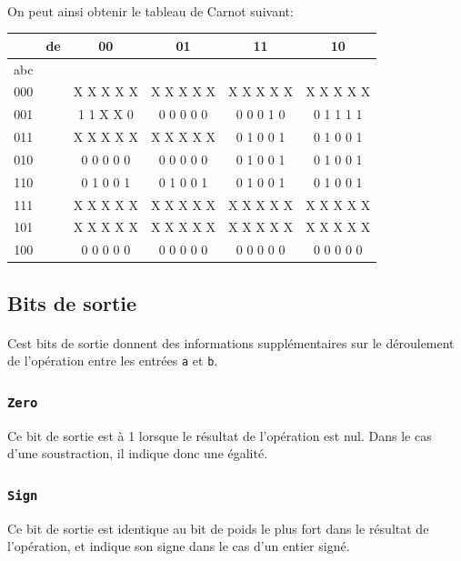 \documentclass[11pt, a4paper, twoside, titlepage]{article}
\begin{document}
\paragraph{}
On peut ainsi obtenir le tableau de Carnot suivant:
\begin{center}
	\ttfamily
	\large
	\begin{tabular}{|c|c|c|c|c|c|}
		\hline
		& de & 00 & 01 & 11 & 10 \\
		\hline
		abc &&&&& \\
		\hline 
		000 && X X X X X & X X X X X & X X X X X & X X X X X \\
		\hline 
		001 && 1 1 X X 0 & 0 0 0 0 0 & 0 0 0 1 0 & 0 1 1 1 1 \\
		\hline 
		011 && X X X X X & X X X X X & 0 1 0 0 1 & 0 1 0 0 1 \\
		\hline 
		010 && 0 0 0 0 0 & 0 0 0 0 0 & 0 1 0 0 1 & 0 1 0 0 1\\
		\hline 
		110 && 0 1 0 0 1 & 0 1 0 0 1 & 0 1 0 0 1 & 0 1 0 0 1 \\
		\hline 
		111 && X X X X X & X X X X X & X X X X X & X X X X X \\
		\hline 
		101 && X X X X X & X X X X X & X X X X X & X X X X X \\
		\hline 
		100 && 0 0 0 0 0 & 0 0 0 0 0 & 0 0 0 0 0 & 0 0 0 0 0 \\
		\hline
	\end{tabular}
\end{center}

\subsection{Bits de sortie}
\paragraph{}
Cest bits de sortie donnent des informations supplémentaires sur le déroulement de l'opération entre les entrées \texttt{a} et \texttt{b}.
	
\subsubsection{\texttt{Zero}}
Ce bit de sortie est à 1 lorsque le résultat de l'opération est nul. Dans le cas d'une soustraction, il indique donc une égalité.

\subsubsection{\texttt{Sign}}
Ce bit de sortie est identique au bit de poids le plus fort dans le résultat de l'opération, et indique son signe dans le cas d'un entier signé.
\end{document}
